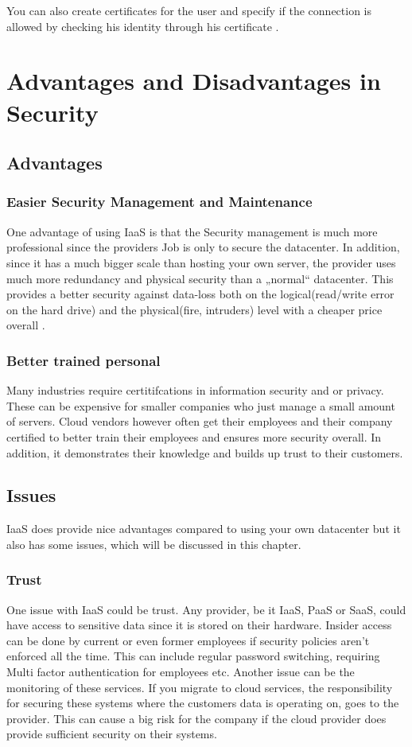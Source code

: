 You can also create certificates for the user and specify if the connection is allowed by checking his identity through his certificate \cite{ssh_supp}. 


\section{Advantages and Disadvantages in Security}


\subsection{Advantages}
\subsubsection{Easier Security Management and Maintenance}
One advantage of using IaaS is that the Security management is much more professional since the providers Job is only to secure the datacenter.
In addition, since it has a much bigger scale than hosting your own server, the provider uses much more redundancy and physical security than a „normal“ datacenter. This provides a better security against data-loss both on the logical(read/write error on the hard drive) and the physical(fire, intruders) level with a cheaper price overall \cite{sonn_pre}.


\subsubsection{Better trained personal}
Many industries require certitifcations in information security and or privacy. These can be expensive for smaller companies who just manage a small amount of servers. Cloud vendors however often get their employees and their company certified to better train their employees and ensures more security overall. In addition, it demonstrates their knowledge and builds up trust to their customers.

\subsection{Issues}
IaaS does provide nice advantages compared to using your own datacenter but it also has some issues, which will be discussed in this chapter.

\subsubsection{Trust}
One issue with IaaS could be trust. Any provider, be it IaaS, PaaS or SaaS, could have access to sensitive data since it is stored on their hardware. Insider access can be done by current or even former employees if security policies aren't enforced all the time. This can include regular password switching, requiring Multi factor authentication for employees etc.
Another issue can be the monitoring of these services. If you migrate to cloud services, the responsibility for securing these systems where the customers data is operating on, goes to the provider. This can cause a big risk for the company if the cloud provider does provide sufficient security on their systems.

